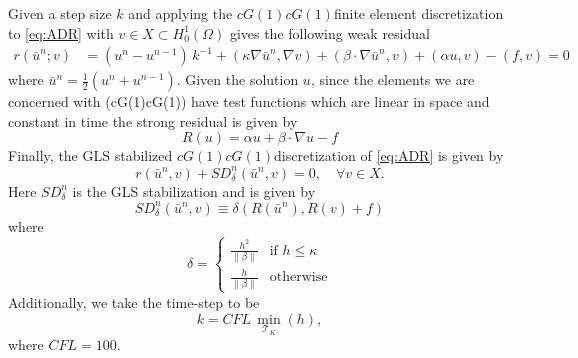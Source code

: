     Given a step size $k$ and applying the $cG(1)cG(1)$finite element
    discretization to \eqref{eq:ADR} with $v \in X \subset H^1_0(\Omega)$ gives
    the following weak residual
    \begin{equation}
    \begin{split}
        r(\bar{u}^n; v) &= \left(u^n - u^{n-1}\right)\,k^{-1}
            + (\kappa \nabla \bar{u}^n, \nabla v)
            + (\beta \cdot \nabla \bar{u}^n, v) + (\alpha u, v) - (f, v) = 0
    \end{split}
    \label{eqn:WeakADR}
    \end{equation}
    where $\bar{u}^n = \frac{1}{2}\left(u^n + u^{n-1}\right)$. Given the
    solution $u$, since the elements we are concerned with (cG(1)cG(1)) have
    test functions which are linear in space and constant in time the strong
    residual is given by
    \begin{equation}
        R(u) = \alpha u + \beta \cdot \nabla u - f
    \label{eqn:StrongADR}
    \end{equation}
    Finally, the GLS stabilized $cG(1)cG(1)$discretization of \eqref{eq:ADR} is
    given by
    \begin{equation}
        r(\bar{u}^n,v) + SD_{\delta}^n(\bar{u}^n,v) = 0,
            \quad \forall v \in X.
        \label{eqn:G2ADR}
    \end{equation}
    Here $SD_{\delta}^n$ is the GLS stabilization and is given by
    \begin{equation}
        SD_{\delta}^n(\bar{u}^n, v) \equiv \delta \left(R(\bar{u}^n), R(v)
            + f\right)
    \label{eq:ADRStabilization}
    \end{equation}
    where
    \begin{equation}
        \delta = \begin{cases}
            \frac{h^2}{\|\beta\|} & \text{if } h \le \kappa \\
            \frac{h}{\|\beta\|} & \text{otherwise}
        \end{cases}
        \label{eq:ADRdelta}
    \end{equation}
    Additionally, we take the time-step to be
    \begin{equation*}
        k = CFL\, \min_{\mathcal{T}_K}(h),
    \end{equation*}
    where $CFL=100$.

\begin{test}[Diffusion Dominated, $\kappa = 0.1$] \label{tst:ADRk1E-1}
\end{test}

